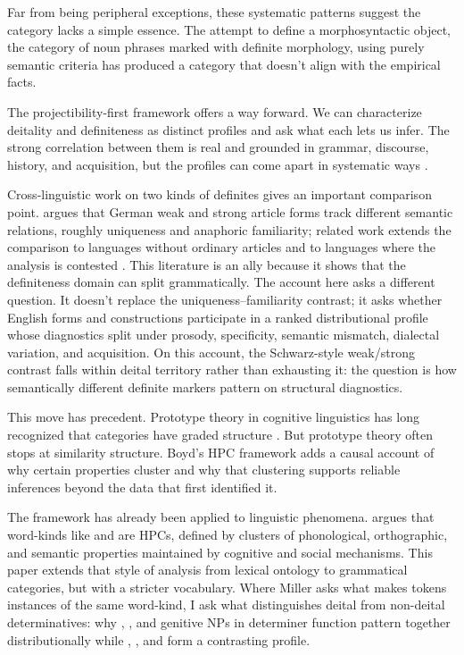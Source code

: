 \documentclass[12pt,letterpaper]{article}
\begin{document}
Far from being peripheral exceptions, these systematic patterns suggest the category lacks a simple essence. The attempt to define a morphosyntactic object, the category of noun phrases marked with definite morphology, using purely semantic criteria has produced a category that doesn't align with the empirical facts.

The projectibility-first framework offers a way forward. We can characterize deitality and definiteness as distinct profiles and ask what each lets us infer. The strong correlation between them is real and grounded in grammar, discourse, history, and acquisition, but the profiles can come apart in systematic ways \parencite{FrancisMichaelis2003}.

Cross-linguistic work on two kinds of definites gives an important comparison point. \textcite{schwarz2009,schwarz2013} argues that German weak and strong article forms track different semantic relations, roughly uniqueness and anaphoric familiarity; related work extends the comparison to languages without ordinary articles and to languages where the analysis is contested \parencite{jenks2018,arkohMatthewson2013,bombi2018}. This literature is an ally because it shows that the definiteness domain can split grammatically. The account here asks a different question. It doesn't replace the uniqueness--familiarity contrast; it asks whether English forms and constructions participate in a ranked distributional profile whose diagnostics split under prosody, specificity, semantic mismatch, dialectal variation, and acquisition. On this account, the Schwarz-style weak/strong contrast falls within deital territory rather than exhausting it: the question is how semantically different definite markers pattern on structural diagnostics.

This move has precedent. Prototype theory in cognitive linguistics has long recognized that categories have graded structure \parencite{rosch1978,lakoff1987}. But prototype theory often stops at similarity structure. Boyd's HPC framework adds a causal account of why certain properties cluster and why that clustering supports reliable inferences beyond the data that first identified it.

The framework has already been applied to linguistic phenomena. \textcite{miller2021} argues that word-kinds like  and  are HPCs, defined by clusters of phonological, orthographic, and semantic properties maintained by cognitive and social mechanisms. This paper extends that style of analysis from lexical ontology to grammatical categories, but with a stricter vocabulary. Where Miller asks what makes tokens instances of the same word-kind, I ask what distinguishes deital from non-deital determinatives: why , , and genitive NPs in determiner function pattern together distributionally while , , and  form a contrasting profile.
\end{document}
